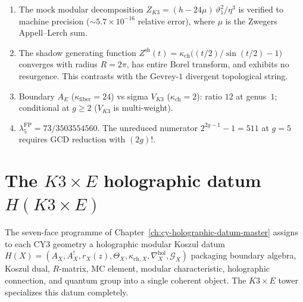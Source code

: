 \begin{enumerate}[label=\textup{(K3-\arabic*)}]
\item The mock modular decomposition
 $Z_{K3} = (h - 24\mu)\,\vartheta_1^2/\eta^3$
 is verified to machine precision ($\sim 5.7 \times 10^{-16}$
 relative error), where $\mu$ is the Zwegers
 Appell--Lerch sum.

\item The shadow generating function
 $Z^{\mathrm{sh}}(t) = \kappa_{\mathrm{ch}}\bigl((t/2)/\sin(t/2) - 1\bigr)$
 converges with radius $R = 2\pi$, has entire Borel
 transform, and exhibits no resurgence. This contrasts
 with the Gevrey-$1$ divergent topological string.

\item Boundary $A_E$ ($\kappa_{\mathrm{fiber}} = 24$) vs sigma $V_{K3}$
 ($\kappa_{\mathrm{ch}} = 2$): ratio $12$ at genus~$1$; conditional
 at $g \geq 2$ ($V_{K3}$ is multi-weight).

\item $\lambda_5^{\mathrm{FP}} = 73/3503554560$. The
 unreduced numerator $2^{2g-1} - 1 = 511$ at $g = 5$
 requires GCD reduction with $(2g)!$.
\end{enumerate}

\section{The \texorpdfstring{$K3 \times E$}{K3 x E} holographic datum \texorpdfstring{$H(K3 \times E)$}{H(K3 x E)}}
\label{sec:k3e-holographic-datum}

The seven-face programme of Chapter~\ref{ch:cy-holographic-datum-master}
assigns to each CY3 geometry a holographic modular Koszul datum
$H(X) = (A_X, A_X^!, r_X(z), \Theta_X, \kappa_{\mathrm{ch},X}, \nabla^{\mathrm{hol}}_X, \mathcal{G}_X)$
packaging boundary algebra, Koszul dual, $R$-matrix, MC element,
modular characteristic, holographic connection, and quantum group
into a single coherent object. The $K3 \times E$ tower specializes
this datum completely.

